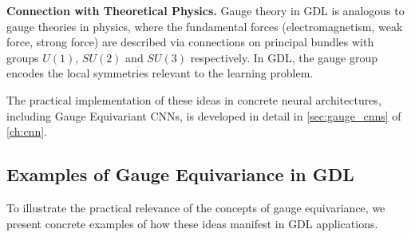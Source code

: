 \textbf{Connection with Theoretical Physics.} Gauge theory in \gls{GDL} is analogous to gauge theories in physics, where the fundamental forces (electromagnetism, weak force, strong force) are described via connections on principal bundles with groups $U(1)$, $SU(2)$ and $SU(3)$ respectively. In \gls{GDL}, the gauge group encodes the local symmetries relevant to the learning problem.

The practical implementation of these ideas in concrete neural architectures, including Gauge Equivariant CNNs, is developed in detail in \autoref{sec:gauge_cnns} of \autoref{ch:cnn}.

\subsection{Examples of Gauge Equivariance in GDL}\label{subsec:ejemplos_gauge_gdl}

To illustrate the practical relevance of the concepts of gauge equivariance, we present concrete examples of how these ideas manifest in \gls{GDL} applications.

